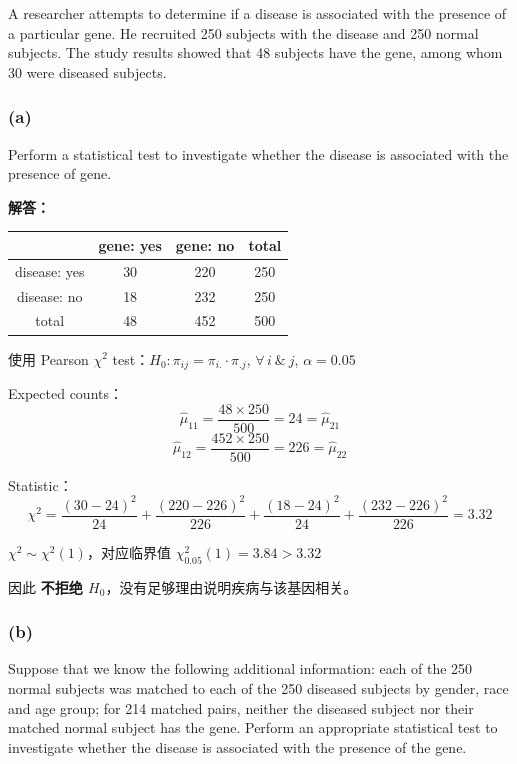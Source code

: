A researcher attempts to determine if a disease is associated with the presence of a particular gene. He recruited 250 subjects with the disease and 250 normal subjects. The study results showed that 48 subjects have the gene, among whom 30 were diseased subjects.

\subsubsection*{(a)}

Perform a statistical test to investigate whether the disease is associated with the presence of gene.

\textbf{解答：}

\begin{center}
\begin{tabular}{c|cc|c}
 & gene: yes & gene: no & total \\
\hline
disease: yes & 30 & 220 & 250 \\
disease: no & 18 & 232 & 250 \\
\hline
total & 48 & 452 & 500 \\
\end{tabular}
\end{center}

使用 Pearson $\chi^2$ test：$H_0: \pi_{ij} = \pi_{i.} \cdot \pi_{.j}$, $\forall\, i\ \&\ j$, $\alpha = 0.05$

Expected counts：
\[
\hat{\mu}_{11} = \frac{48 \times 250}{500} = 24 = \hat{\mu}_{21}
\]
\[
\hat{\mu}_{12} = \frac{452 \times 250}{500} = 226 = \hat{\mu}_{22}
\]

Statistic：
\[
\chi^2 = \frac{(30 - 24)^2}{24} + \frac{(220 - 226)^2}{226} + \frac{(18 - 24)^2}{24} + \frac{(232 - 226)^2}{226} = 3.32
\]

$\chi^2 \sim \chi^2(1)$，对应临界值 $\chi^2_{0.05}(1) = 3.84 > 3.32$

因此 \textbf{不拒绝 $H_0$}，没有足够理由说明疾病与该基因相关。

\subsubsection*{(b)}

Suppose that we know the following additional information: each of the 250 normal subjects was matched to each of the 250 diseased subjects by gender, race and age group; for 214 matched pairs, neither the diseased subject nor their matched normal subject has the gene. Perform an appropriate statistical test to investigate whether the disease is associated with the presence of the gene.

